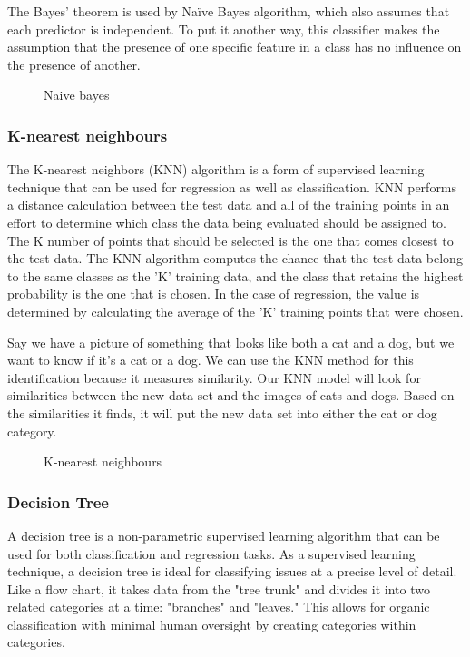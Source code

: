 The Bayes' theorem is used by Naïve Bayes algorithm, which also assumes that each predictor is independent. To put it another way, this classifier makes the assumption that the presence of one specific feature in a class has no influence on the presence of another.

\begin{figure}[htb]
	\centering
	\caption{Naive bayes}
	\label{fig:nb}
\end{figure}

\subsubsection{K-nearest neighbours}
The K-nearest neighbors (KNN) algorithm is a form of supervised learning technique that can be used for regression as well as classification. KNN performs a distance calculation between the test data and all of the training points in an effort to determine which class the data being evaluated should be assigned to. The K number of points that should be selected is the one that comes closest to the test data. The KNN algorithm computes the chance that the test data belong to the same classes as the 'K' training data, and the class that retains the highest probability is the one that is chosen. In the case of regression, the value is determined by calculating the average of the 'K' training points that were chosen.

Say we have a picture of something that looks like both a cat and a dog, but we want to know if it's a cat or a dog. We can use the KNN method for this identification because it measures similarity. Our KNN model will look for similarities between the new data set and the images of cats and dogs. Based on the similarities it finds, it will put the new data set into either the cat or dog category.

\begin{figure}[htb]
	\centering
	\caption{K-nearest neighbours}
	\label{fig:knn}
\end{figure}

\subsubsection{Decision Tree}
A decision tree is a non-parametric supervised learning algorithm that can be used for both classification and regression tasks. As a supervised learning technique, a decision tree is ideal for classifying issues at a precise level of detail. Like a flow chart, it takes data from the "tree trunk" and divides it into two related categories at a time: "branches" and "leaves." This allows for organic classification with minimal human oversight by creating categories within categories.


